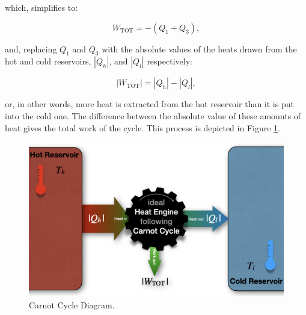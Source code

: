 \documentclass[
]{book}
\theoremstyle{definition}
\theoremstyle{definition}
\theoremstyle{definition}
\theoremstyle{remark}
\begin{document}
which, simplifies to:

\begin{equation}
W_{\text{TOT}}=-(Q_1+Q_3),
  \label{eq:WtotCC3}
\end{equation}

and, replacing \(Q_1\) and \(Q_3\) with the absolute values of the heats drawn from the hot and cold reservoirs, \(\left| Q_h \right|\), and \(\left| Q_l \right|\) respectively:

\begin{equation}
\left| W_{\text{TOT}} \right| = \left| Q_h \right| - \left| Q_l \right|,
  \label{eq:QtotCC2}
\end{equation}

or, in other words, more heat is extracted from the hot reservoir than it is put into the cold one. The difference between the absolute value of these amounts of heat gives the total work of the cycle. This process is depicted in Figure \ref{fig:FigCarnotEff}.

\begin{figure}

{\centering \includegraphics[width=0.8\linewidth]{./img/OEP_Figures.009} 

}

\caption{Carnot Cycle Diagram.}\label{fig:FigCarnotEff}
\end{figure}
\end{document}
